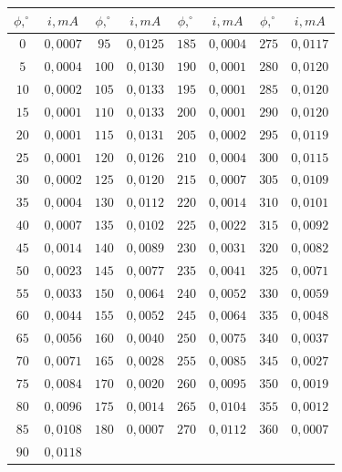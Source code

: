 \documentclass{article}
\begin{document}
\begin{center}
    \begin{tabular}{|c|c|c|c|c|c|c|c|}
    \hline
    $\phi , ^{\circ} $ & $i , mA$ & $\phi , ^{\circ}$ & $i , mA$ & $\phi , ^{\circ}$ & $i , mA$ & $\phi , ^{\circ}$ & $i , mA$\\ \hline
    $0$ & $0,0007$ & $95$ & $0,0125$ & $185$ & $0,0004$ & $275$ & $0,0117$\\ \hline
    $5$ & $0,0004$ & $100$ & $0,0130$ & $190$ & $0,0001$ & $280$ & $0,0120$\\ \hline
    $10$ & $0,0002$ & $105$ & $0,0133$ & $195$ & $0,0001$ & $285$ & $0,0120$\\ \hline
    $15$ & $0,0001$ & $110$ & $0,0133$ & $200$ & $0,0001$ & $290$ & $0,0120$\\ \hline
    $20$ & $0,0001$ & $115$ & $0,0131$ & $205$ & $0,0002$ & $295$ & $0,0119$\\ \hline
    $25$ & $0,0001$ & $120$ & $0,0126$ & $210$ & $0,0004$ & $300$ & $0,0115$\\ \hline
    $30$ & $0,0002$ & $125$ & $0,0120$ & $215$ & $0,0007$ & $305$ & $0,0109$\\ \hline
    $35$ & $0,0004$ & $130$ & $0,0112$ & $220$ & $0,0014$ & $310$ & $0,0101$\\ \hline
    $40$ & $0,0007$ & $135$ & $0,0102$ & $225$ & $0,0022$ & $315$ & $0,0092$\\ \hline
    $45$ & $0,0014$ & $140$ & $0,0089$ & $230$ & $0,0031$ & $320$ & $0,0082$\\ \hline
    $50$ & $0,0023$ & $145$ & $0,0077$ & $235$ & $0,0041$ & $325$ & $0,0071$\\ \hline
    $55$ & $0,0033$ & $150$ & $0,0064$ & $240$ & $0,0052$ & $330$ & $0,0059$\\ \hline
    $60$ & $0,0044$ & $155$ & $0,0052$ & $245$ & $0,0064$ & $335$ & $0,0048$\\ \hline
    $65$ & $0,0056$ & $160$ & $0,0040$ & $250$ & $0,0075$ & $340$ & $0,0037$\\ \hline
    $70$ & $0,0071$ & $165$ & $0,0028$ & $255$ & $0,0085$ & $345$ & $0,0027$\\ \hline
    $75$ & $0,0084$ & $170$ & $0,0020$ & $260$ & $0,0095$ & $350$ & $0,0019$\\ \hline
    $80$ & $0,0096$ & $175$ & $0,0014$ & $265$ & $0,0104$ & $355$ & $0,0012$\\ \hline
    $85$ & $0,0108$ & $180$ & $0,0007$ & $270$ & $0,0112$ & $360$ & $0,0007$\\ \hline
    $90$ & $0,0118$ &       &          &       &          &       &         \\ \hline
    \end{tabular}
\end{center}
$$$$\\
\end{document}

